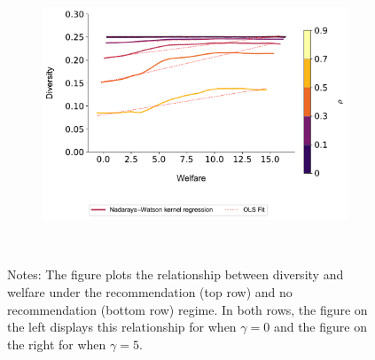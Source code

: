 \documentclass[manuscript]{acmart}
\begin{document}
\begin{figure}[t]
\begin{subfigure}{.3\textwidth}
\end{subfigure}
\begin{subfigure}{.3\textwidth}
\includegraphics[width=1.0\linewidth]{figures/diversity_welfare_ra_partial_n_200.pdf}
\end{subfigure}\\
\caption*{\scriptsize Notes: The figure plots the relationship between diversity and welfare under the recommendation (top row)  and no recommendation (bottom row) regime. In both rows, the figure on the left displays this relationship for when $\gamma = 0$ and the figure on the right for when $\gamma = 5$.}\label{fig:diversity_welfare_ra}
\end{figure}
\addtocounter{figure}{-1}
\end{document}
